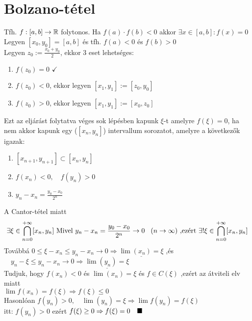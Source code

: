 \documentclass[a4paper,11pt]{article}
\begin{document}
\section{Bolzano-tétel}
\tetel Tfh. $f: [a,b] \to \mathbb{R}$ folytonos. Ha $f(a)\cdot f(b) < 0$ akkor
$\exists x \in [a,b]: f(x) = 0$\\[0.1cm]
\biz Legyen $ [x_0,y_0] = [a,b] $ és tfh. $f(a) < 0$ és $f(b) > 0 $\\[0.1cm] Legyen
$z_0 := \frac{x_0+y_0}{2}$, ekkor 3 eset lehetséges: 
\begin{enumerate}
	\item $f(z_0) = 0$ $\checkmark$
	\item $f(z_0) < 0$, ekkor legyen $[x_1,y_1] := [z_0,y_0]$
	\item $f(z_0) > 0$, ekkor legyen $[x_1,y_1] := [x_0,z_0]$
\end{enumerate}
Ezt az eljárást folytatva véges sok lépésben kapunk $\xi$-t amelyre $f(\xi) = 0$,
ha nem akkor kapunk egy ($[x_n,y_n]$) intervallum sorozatot, amelyre a következők
igazak:
\begin{enumerate}
	\item $[x_{n+1},y_{n+1}]\subset[x_n,y_n]$
	\item $f(x_n) < 0,\quad f(y_n) > 0$
	\item $y_n - x_n = \frac{y_0-x_0}{2^n}$
\end{enumerate}
\newpage
A Cantor-tétel miatt \[ \exists\xi\in\bigcap_{n=0}^{+\infty}[x_n,y_n]\text{ Mivel }
y_n-x_n=\frac{y_0-x_0}{2^n}\to0\hspace*{0.3cm}(n\to\infty)\text{ ,ezért  }\exists!
\xi\in\bigcap_{n=0}^{+\infty}[x_n,y_n] \]
Továbbá $0\leq\xi-x_n\leq y_n-x_n\to0\Rightarrow\underline{\lim(x_n)=\xi}$ ,és
$\quad y_n-\xi\leq y_n-x_n\to0\Rightarrow\underline{\lim(y_n)=\xi}$\\[0.2cm]
Tudjuk, hogy $f(x_n)<0$ és $\lim(x_n)=\xi$ és $f\in C(\xi)$ ,ezért az átviteli elv
miatt\\ $\lim f(x_n)=f(\xi)\Rightarrow f(\xi)\leq0$\\[0.1cm] Hasonlóan $f(y_n)>0,
\quad\lim(y_n)=\xi\Rightarrow\lim f(y_n)=f(\xi)$\\itt: $f(y_n)>0$ ezért $f(\xi)
\geq0\Rightarrow f(\xi)=0\quad\blacksquare$
\end{document}

